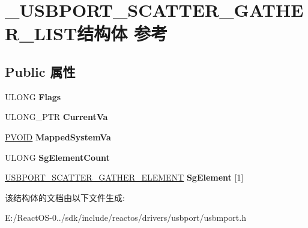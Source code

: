 \hypertarget{struct___u_s_b_p_o_r_t___s_c_a_t_t_e_r___g_a_t_h_e_r___l_i_s_t}{}\section{\+\_\+\+U\+S\+B\+P\+O\+R\+T\+\_\+\+S\+C\+A\+T\+T\+E\+R\+\_\+\+G\+A\+T\+H\+E\+R\+\_\+\+L\+I\+S\+T结构体 参考}
\label{struct___u_s_b_p_o_r_t___s_c_a_t_t_e_r___g_a_t_h_e_r___l_i_s_t}
\subsection*{Public 属性}
\begin{DoxyCompactItemize}
\item 
\mbox{\label{struct___u_s_b_p_o_r_t___s_c_a_t_t_e_r___g_a_t_h_e_r___l_i_s_t_a8e3efe5cc0673a93ca4167ccfce89ddd}} 
U\+L\+O\+NG {\bfseries Flags}
\item 
\mbox{\label{struct___u_s_b_p_o_r_t___s_c_a_t_t_e_r___g_a_t_h_e_r___l_i_s_t_a3b8a90b5abc7251c3bebcb05da4df48f}} 
U\+L\+O\+N\+G\+\_\+\+P\+TR {\bfseries Current\+Va}
\item 
\mbox{\label{struct___u_s_b_p_o_r_t___s_c_a_t_t_e_r___g_a_t_h_e_r___l_i_s_t_ae8cf6bcc0f45f2c9516c23a936ee51dd}} 
\hyperlink{interfacevoid}{P\+V\+O\+ID} {\bfseries Mapped\+System\+Va}
\item 
\mbox{\label{struct___u_s_b_p_o_r_t___s_c_a_t_t_e_r___g_a_t_h_e_r___l_i_s_t_aaa139c0399927e19cafc6bb8be2bbf8e}} 
U\+L\+O\+NG {\bfseries Sg\+Element\+Count}
\item 
\mbox{\label{struct___u_s_b_p_o_r_t___s_c_a_t_t_e_r___g_a_t_h_e_r___l_i_s_t_a00355a354e0b1a2032f59e11022df366}} 
\hyperlink{struct___u_s_b_p_o_r_t___s_c_a_t_t_e_r___g_a_t_h_e_r___e_l_e_m_e_n_t}{U\+S\+B\+P\+O\+R\+T\+\_\+\+S\+C\+A\+T\+T\+E\+R\+\_\+\+G\+A\+T\+H\+E\+R\+\_\+\+E\+L\+E\+M\+E\+NT} {\bfseries Sg\+Element} \mbox{[}1\mbox{]}
\end{DoxyCompactItemize}


该结构体的文档由以下文件生成\+:\begin{DoxyCompactItemize}
\item 
E\+:/\+React\+O\+S-\/0../sdk/include/reactos/drivers/usbport/usbmport.\+h\end{DoxyCompactItemize}
